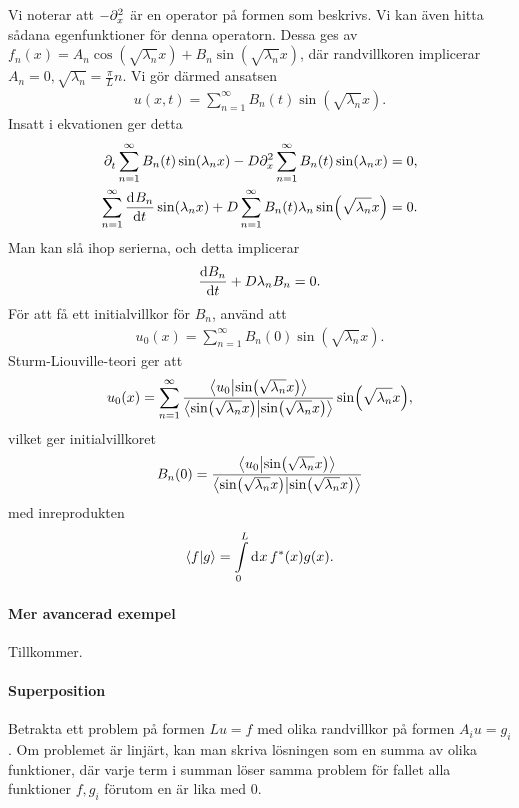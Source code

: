 Vi noterar att $-\del[2]{x}{}$ är en operator på formen som beskrivs. Vi kan även hitta sådana egenfunktioner för denna operatorn. Dessa ges av $f_{n}(x) = A_{n}\cos(\sqrt{\lambda_{n}}x) + B_{n}\sin(\sqrt{\lambda_{n}}x)$, där randvillkoren implicerar $A_{n} = 0, \sqrt{\lambda_{n}} = \frac{\pi}{L}n$. Vi gör därmed ansatsen
\begin{align*}
	u(x, t) = \sum\limits_{n = 1}^{\infty}B_{n}(t)\sin(\sqrt{\lambda_{n}}x).
\end{align*}
Insatt i ekvationen ger detta
\begin{align*}
	\del{t}{\sum\limits_{n = 1}^{\infty}B_{n}(t)\sin(\lambda_{n}x)} - D\del[2]{x}{\sum\limits_{n = 1}^{\infty}B_{n}(t)\sin(\lambda_{n}x)}     &= 0, \\
	\sum\limits_{n = 1}^{\infty}\deval{B_{n}}{t}{t}\sin(\lambda_{n}x) + D\sum\limits_{n = 1}^{\infty}B_{n}(t)\lambda_{n}\sin(\sqrt{\lambda_{n}}x) &= 0.
\end{align*}
Man kan slå ihop serierna, och detta implicerar
\begin{align*}
	\dv{B_{n}}{t} + D\lambda_{n}B_{n} = 0.
\end{align*}
För att få ett initialvillkor för $B_{n}$, använd att
\begin{align*}
	u_{0}(x) = \sum\limits_{n = 1}^{\infty}B_{n}(0)\sin(\sqrt{\lambda_{n}}x).
\end{align*}
Sturm-Liouville-teori ger att
\begin{align*}
	u_{0}(x) = \sum\limits_{n = 1}^{\infty}\frac{\inprod{u_{0}}{\sin(\sqrt{\lambda_{n}}x)}}{\inprod{\sin(\sqrt{\lambda_{n}}x)}{\sin(\sqrt{\lambda_{n}}x)}}\sin(\sqrt{\lambda_{n}}x),
\end{align*}
vilket ger initialvillkoret
\begin{align*}
	B_{n}(0) = \frac{\inprod{u_{0}}{\sin(\sqrt{\lambda_{n}}x)}}{\inprod{\sin(\sqrt{\lambda_{n}}x)}{\sin(\sqrt{\lambda_{n}}x)}}
\end{align*}
med inreprodukten
\begin{align*}
	\inprod{f}{g} = \inteval{0}{L}{x}{\cc{f}(x)g(x)}.
\end{align*}

\paragraph{Mer avancerad exempel}
Tillkommer.

\paragraph{Superposition}
Betrakta ett problem på formen $Lu = f$ med olika randvillkor på formen $A_{i}u = g_{i}$. Om problemet är linjärt, kan man skriva lösningen som en summa av olika funktioner, där varje term i summan löser samma problem för fallet alla funktioner $f, g_{i}$ förutom en är lika med $0$.

